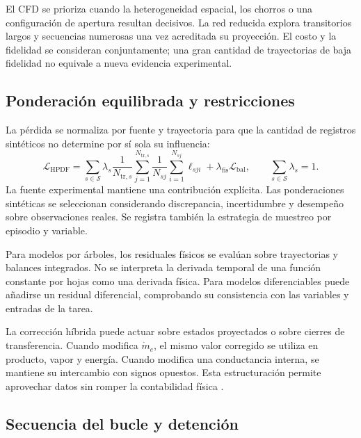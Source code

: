 El CFD se prioriza cuando la heterogeneidad espacial, los chorros o una configuración de apertura resultan decisivos. La red reducida explora transitorios largos y secuencias numerosas una vez acreditada su proyección. El costo y la fidelidad se consideran conjuntamente; una gran cantidad de trayectorias de baja fidelidad no equivale a nueva evidencia experimental.

\subsection{Ponderación equilibrada y restricciones}

La pérdida se normaliza por fuente y trayectoria para que la cantidad de registros sintéticos no determine por sí sola su influencia:
\begin{equation}
\mathcal L_{\mathrm{HPDF}}=
\sum_{s\in\mathcal S}
\lambda_s\frac{1}{N_{\mathrm{tr},s}}
\sum_{j=1}^{N_{\mathrm{tr},s}}
\frac{1}{N_{sj}}\sum_{i=1}^{N_{sj}}
\ell_{sji}
+\lambda_{\mathrm{fis}}\mathcal L_{\mathrm{bal}},
\qquad
\sum_{s\in\mathcal S}\lambda_s=1.
\label{met:perdida_hpdf}
\end{equation}
La fuente experimental mantiene una contribución explícita. Las ponderaciones sintéticas se seleccionan considerando discrepancia, incertidumbre y desempeño sobre observaciones reales. Se registra también la estrategia de muestreo por episodio y variable.

Para modelos por árboles, los residuales físicos se evalúan sobre trayectorias y balances integrados. No se interpreta la derivada temporal de una función constante por hojas como una derivada física. Para modelos diferenciables puede añadirse un residual diferencial, comprobando su consistencia con las variables y entradas de la tarea.

La corrección híbrida puede actuar sobre estados proyectados o sobre cierres de transferencia. Cuando modifica $\dot m_e$, el mismo valor corregido se utiliza en producto, vapor y energía. Cuando modifica una conductancia interna, se mantiene su intercambio con signos opuestos. Esta estructuración permite aprovechar datos sin romper la contabilidad física \cite{psichogios1992}.

\subsection{Secuencia del bucle y detención}


